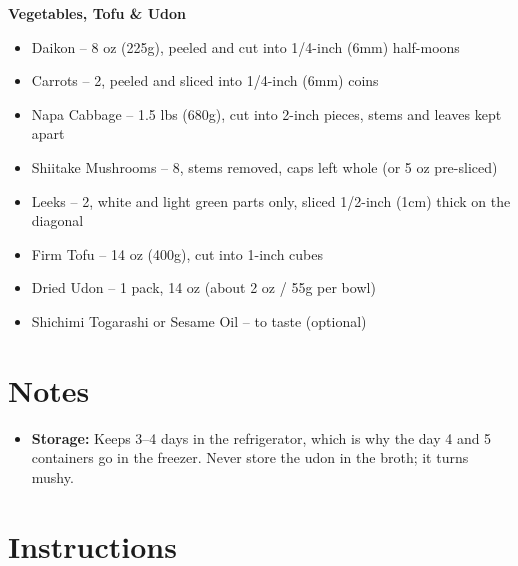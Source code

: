\textbf{Vegetables, Tofu \& Udon}
\begin{itemize}[itemsep=0.1em, label={\raisebox{-0.1ex}{\large\textbullet}}]
      \item[\cut] Daikon – 8 oz (225g), peeled and cut into 1/4-inch (6mm) half-moons
      \item[\cut] Carrots – 2, peeled and sliced into 1/4-inch (6mm) coins
      \item[\cut] Napa Cabbage – 1.5 lbs (680g), cut into 2-inch pieces, stems and leaves kept apart
      \item[\cut] Shiitake Mushrooms – 8, stems removed, caps left whole (or 5 oz pre-sliced)
      \item[\cut] Leeks – 2, white and light green parts only, sliced 1/2-inch (1cm) thick on the diagonal
      \item[\cut] Firm Tofu – 14 oz (400g), cut into 1-inch cubes
      \item Dried Udon – 1 pack, 14 oz (about 2 oz / 55g per bowl)
      \item Shichimi Togarashi or Sesame Oil – to taste (optional)
\end{itemize}

\section*{Notes}

\begin{itemize}
      \item \textbf{Storage:} Keeps 3--4 days in the refrigerator, which is why the day 4 and 5 containers go in the freezer. Never store the udon in the broth; it turns mushy.
\end{itemize}

\newpage
{}
\section*{Instructions}

